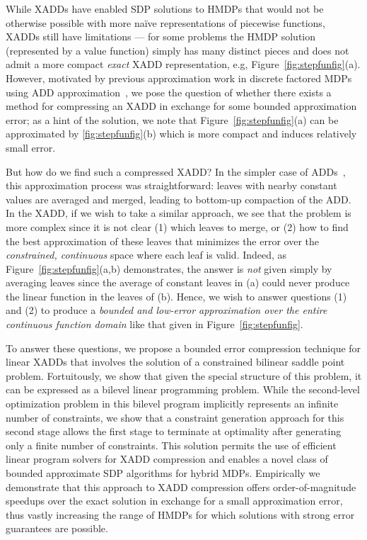 While XADDs have enabled SDP solutions to HMDPs that would not be
otherwise possible with more na\"{i}ve representations of piecewise
functions, XADDs still have limitations --- for some problems the HMDP
solution (represented by a value function) simply has many distinct
pieces and does not admit a more compact \emph{exact} XADD
representation, e.g, Figure~\ref{fig:stepfunfig}(a).  However,
motivated by previous approximation work in discrete factored MDPs
using ADD approximation~\cite{apricodd}, we pose the question of
whether there exists a method for compressing an XADD in exchange
for some bounded approximation error; as a hint of the solution, we
note that Figure~\ref{fig:stepfunfig}(a) can be approximated
by \ref{fig:stepfunfig}(b) which is more compact and induces relatively 
small error.  

But how do we find such a compressed XADD?  In the simpler case of
ADDs~\cite{apricodd}, this approximation process was straightforward:
leaves with nearby constant values are averaged and merged, leading to
bottom-up compaction of the ADD.  In the XADD, if we wish to take a
similar approach, we see that the problem is more complex since it is
not clear (1) which leaves to merge, or (2) how to find the best
approximation of these leaves that minimizes the error over the
\emph{constrained, continuous} space where each leaf is valid.  Indeed, as
Figure~\ref{fig:stepfunfig}(a,b) demonstrates, the answer
is \emph{not} given simply by averaging leaves since the average of
constant leaves in (a) could never produce the linear function in the
leaves of (b).  Hence, we wish to answer questions (1) and (2) to
produce a \emph{bounded and low-error approximation over the entire
continuous function domain} like that given in
Figure~\ref{fig:stepfunfig}.

To answer these questions, we propose a bounded error compression
technique for linear XADDs that involves the solution of a constrained
bilinear saddle point problem.  Fortuitously, we show that given the
special structure of this problem, it can be expressed as a bilevel
linear programming problem. %
While the second-level optimization problem in this
bilevel program implicitly represents an infinite number of
constraints, we show that a constraint generation approach for 
this second stage allows the first stage to terminate at
optimality after generating only a finite number of constraints.  This
solution permits the use of efficient linear program solvers for XADD
compression and enables a novel class of bounded approximate SDP
algorithms for hybrid MDPs.  Empirically we demonstrate that this
approach to XADD compression offers order-of-magnitude speedups over
the exact solution in exchange for a small approximation error, thus
vastly increasing the range of HMDPs for which solutions with strong
error guarantees are possible.

